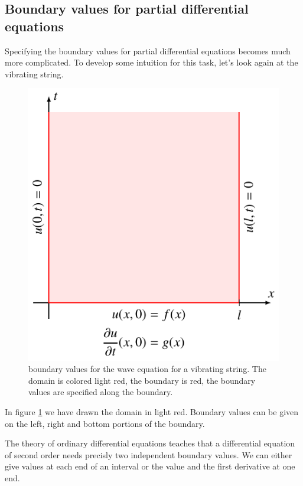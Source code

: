 \subsection{Boundary values for partial differential equations\label{klassifikation:randwerte-pde}}
Specifying the boundary values for partial differential equations
becomes much more complicated.
To develop some intuition for this task, let's look again at the
vibrating string.
\begin{figure}
\begin{center}
\includegraphics{2-classification/images/wave.pdf}
\end{center}
\caption{boundary values for the wave equation for a vibrating string.
The domain is colored light red, the boundary is red, the boundary
values are specified along the boundary.
\label{klassifikation:randwertesaite}}
\end{figure}
In figure \ref{klassifikation:randwertesaite}
we have drawn the domain in light red.
Boundary values can be given on the left, right and bottom portions
of the boundary.

The theory of ordinary differential equations teaches that a 
differential equation of second order needs precisly two independent
boundary values.
We can either give values at each end of an interval or the value and the
first derivative at one end.


